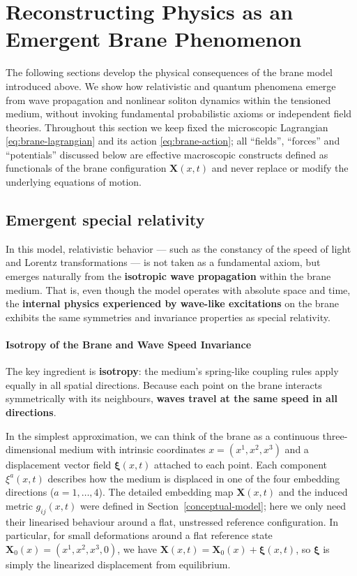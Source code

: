 \section{Reconstructing Physics as an Emergent Brane
Phenomenon}\label{reconstructing-physics-as-an-emergent-brane-phenomenon}

The following sections develop the physical consequences of the brane model introduced above. We show how relativistic and quantum phenomena emerge from wave propagation and nonlinear soliton dynamics within the tensioned medium, without invoking fundamental probabilistic axioms or independent field theories.
Throughout this section we keep fixed the microscopic Lagrangian
\eqref{eq:brane-lagrangian} and its action \eqref{eq:brane-action}; all
``fields'', ``forces'' and ``potentials'' discussed below are effective
macroscopic constructs defined as functionals of the brane configuration
$\mathbf X(x,t)$ and never replace or modify the underlying equations of motion.

\subsection{Emergent special relativity}
\label{sec:emergent-relativity}\label{emergent-relativity-and-lorentz-invariance}

In this model, relativistic behavior --- such as the constancy of the
speed of light and Lorentz transformations --- is not taken as a
fundamental axiom, but emerges naturally from the \textbf{isotropic wave
propagation} within the brane medium. That is, even though the model
operates with absolute space and time, the \textbf{internal physics
experienced by wave-like excitations} on the brane exhibits the same
symmetries and invariance properties as special relativity.

\paragraph{Isotropy of the Brane and Wave Speed
Invariance}\label{isotropy-of-the-brane-and-wave-speed-invariance}

The key ingredient is \textbf{isotropy}: the medium's spring-like
coupling rules apply equally in all spatial directions. Because each
point on the brane interacts symmetrically with its neighbours,
\textbf{waves travel at the same speed in all directions}.

In the simplest approximation, we can think of the brane as a continuous
three-dimensional medium with intrinsic coordinates
$x=(x^1,x^2,x^3)$ and a displacement vector field
$\boldsymbol{\xi}(x,t)$ attached to each point. Each component
$\xi^a(x,t)$ describes how the medium is displaced in one of the four
embedding directions ($a=1,\dots,4$). The detailed embedding map
$\mathbf{X}(x,t)$ and the induced metric $g_{ij}(x,t)$ were defined
in Section~\ref{conceptual-model}; here we only need their
linearised behaviour around a flat, unstressed reference configuration.
In particular, for small deformations around a flat reference state $\mathbf{X}_0(x)=(x^1,x^2,x^3,0)$, we have $\mathbf{X}(x,t)=\mathbf{X}_0(x)+\boldsymbol{\xi}(x,t)$, so $\boldsymbol{\xi}$ is simply the linearized displacement from equilibrium.

